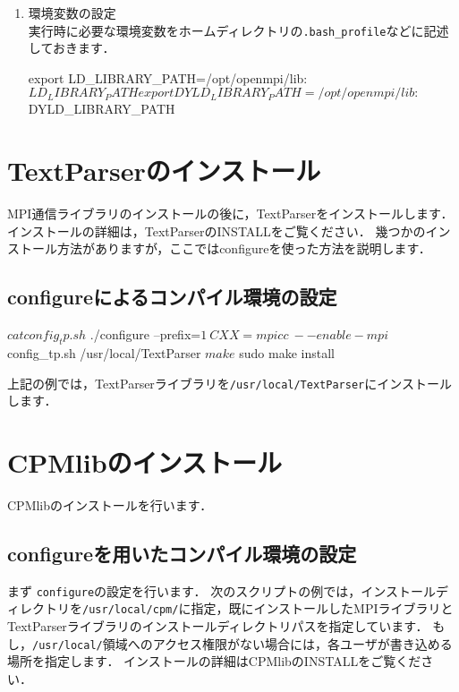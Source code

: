 \begin{enumerate}
{\small
{}
}

\item 環境変数の設定\\
実行時に必要な環境変数をホームディレクトリの\verb|.bash_profile|などに記述しておきます．

{\small
\begin{program}
export LD_LIBRARY_PATH=/opt/openmpi/lib:$LD_LIBRARY_PATH
export DYLD_LIBRARY_PATH=/opt/openmpi/lib:$DYLD_LIBRARY_PATH
\end{program}
}

\end{enumerate}



%
\section{TextParserのインストール}

MPI通信ライブラリのインストールの後に，TextParserをインストールします．
インストールの詳細は，TextParserのINSTALLをご覧ください．
幾つかのインストール方法がありますが，ここではconfigureを使った方法を説明します．

%
\subsection{configureによるコンパイル環境の設定}

{\small
\begin{program}
$ cat config_tp.sh
$ ./configure --prefix=$1 \
              CXX=mpicc \
              --enable-mpi
	    
$ config_tp.sh /usr/local/TextParser
$ make
$ sudo make install
\end{program}
}

上記の例では，TextParserライブラリを\verb|/usr/local/TextParser|にインストールします．



%
\section{CPMlibのインストール}

CPMlibのインストールを行います．

%
\subsection{configureを用いたコンパイル環境の設定}
まず \verb|configure|の設定を行います．
次のスクリプトの例では，インストールディレクトリを\verb|/usr/local/cpm/|に指定，既にインストールしたMPIライブラリとTextParserライブラリのインストールディレクトリパスを指定しています．
もし，\verb|/usr/local/|領域へのアクセス権限がない場合には，各ユーザが書き込める場所を指定します．
インストールの詳細はCPMlibのINSTALLをご覧ください．

